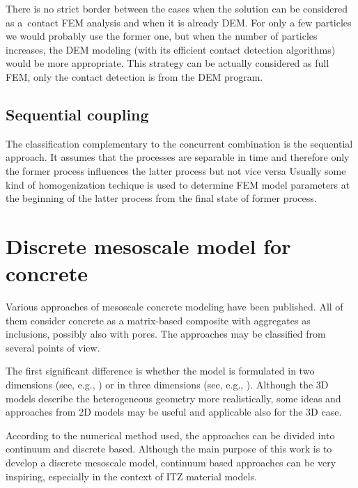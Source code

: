 There is no strict border between the cases when the solution can be considered as a~contact FEM analysis and when it is already DEM.
For only a few particles we would probably use the former one, but when the number of particles increases, the DEM modeling (with its efficient contact detection algorithms) would be more appropriate.
This strategy can be actually considered as full FEM, only the contact detection is  from the DEM program.

\subsection{Sequential coupling}
The classification complementary to the concurrent combination is the sequential approach.
It assumes that the processes are separable in time and therefore only the former process
influences the latter process
but not vice versa
Usually some kind of homogenization techique is used to determine FEM model parameters at the beginning of the latter
process from the final state of former
process.





\section{Discrete mesoscale model for concrete}

Various approaches of mesoscale concrete modeling have been published.
All of them consider concrete as a matrix-based composite with aggregates as inclusions, possibly also with pores.
The approaches may be classified from several points of view.

The first significant difference is whether the model is formulated in two dimensions (see, e.g.,
\cite{%
	HafnerEckardtLutherKonke2006a,%
	PedersenSimoneSluys2013a,%
	SatohYamadaIshiyama2013a,%
	WangLinGu2008a,%
	ZhouHao2008a,%
	GrasslJirasek2010a,%
}) or in three dimensions (see, e.g.,
\cite{%
	TranDonzeMarin2011a,%
	WriggersMoftah2006,%
	KimAlrub2011a,%
	CaballeroWillamCarol2008a,%
	Cusatis2001a,%
	LandisBolander2009a,%
	AsahinaLandisBolander2011a%
}).
Although the 3D models describe the heterogeneous geometry more realistically, some ideas and approaches from 2D models may be useful and applicable also for the 3D case.

According to the numerical method used, the approaches can be divided into continuum and discrete based.
Although the main purpose of this work is to develop a discrete mesoscale model, continuum based approaches can be very inspiring, especially in the context of ITZ material models.

